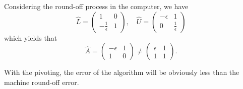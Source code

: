 \documentclass[a4paper]{article}
\theoremstyle{definition}
\begin{document}
Considering the round-off process in the computer, we have 
\begin{equation}
  \hat{L} = \begin{pmatrix}
    1 & 0 \\ 
    -\frac{1}{\epsilon} & 1 
  \end{pmatrix}, \quad 
  \hat{U} = \begin{pmatrix}
    -\epsilon & 1 \\
    0 & \frac{1}{\epsilon} 
  \end{pmatrix}
  \label{eq:lu-decomposition-with-round-off}
\end{equation}
which yields that 
\begin{equation}
  \hat{A} = \begin{pmatrix}
    -\epsilon & 1 \\ 
    1 & 0
  \end{pmatrix} \ne \begin{pmatrix}
    \epsilon & 1 \\
    1 & 1
  \end{pmatrix}.
  \label{eq:linear-system-with-small-values-with-round-off}
\end{equation}

With the pivoting, the error of the algorithm will be obviously less than the machine round-off error.
\end{document}
